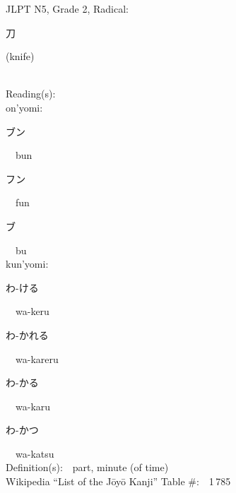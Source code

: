 \begin{multicols}{2}
{JLPT N5, Grade 2, Radical:\ \ {\begin{CJK}{UTF8}{min} 刀 \end{CJK}} (knife) } \\
Reading(s):\ \ \\
{\hspace*{1em}}on'yomi:\ \ \\
{\hspace*{2em}}{\begin{CJK}{UTF8}{min} ブン \end{CJK}}\ \ bun\ \ \\
{\hspace*{2em}}{\begin{CJK}{UTF8}{min} フン \end{CJK}}\ \ fun\ \ \\
{\hspace*{2em}}{\begin{CJK}{UTF8}{min} ブ \end{CJK}}\ \ bu\ \ \\
{\hspace*{1em}}kun'yomi:\ \ \\
{\hspace*{2em}}{\begin{CJK}{UTF8}{min} わ-ける \end{CJK}}\ \ wa-keru\ \ \\
{\hspace*{2em}}{\begin{CJK}{UTF8}{min} わ-かれる \end{CJK}}\ \ wa-kareru\ \ \\
{\hspace*{2em}}{\begin{CJK}{UTF8}{min} わ-かる \end{CJK}}\ \ wa-karu\ \ \\
{\hspace*{2em}}{\begin{CJK}{UTF8}{min} わ-かつ \end{CJK}}\ \ wa-katsu\ \ \\
Definition(s):\ \ part, minute (of time) \\
Wikipedia ``List of the J\=oy\=o Kanji'' Table \#:\ \ 1\,785 \\
\ \ \\
{\fontsize{34pt}{40pt}  }\ \ \\  %

\end{multicols}
